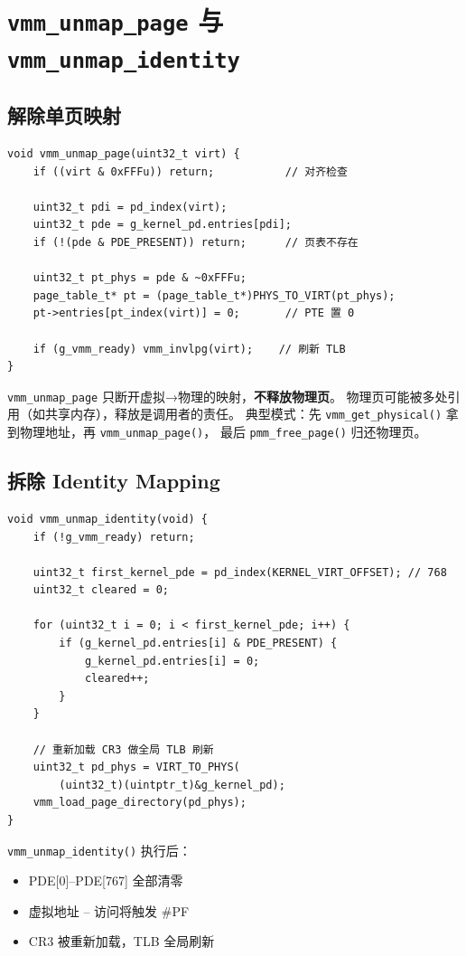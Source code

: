 \section{\texttt{vmm\_unmap\_page} 与 \texttt{vmm\_unmap\_identity}}

\subsection{解除单页映射}

\begin{lstlisting}[style=cstyle]
void vmm_unmap_page(uint32_t virt) {
    if ((virt & 0xFFFu)) return;           // 对齐检查

    uint32_t pdi = pd_index(virt);
    uint32_t pde = g_kernel_pd.entries[pdi];
    if (!(pde & PDE_PRESENT)) return;      // 页表不存在

    uint32_t pt_phys = pde & ~0xFFFu;
    page_table_t* pt = (page_table_t*)PHYS_TO_VIRT(pt_phys);
    pt->entries[pt_index(virt)] = 0;       // PTE 置 0

    if (g_vmm_ready) vmm_invlpg(virt);    // 刷新 TLB
}
\end{lstlisting}

\begin{warnbox}
\texttt{vmm\_unmap\_page} 只断开虚拟→物理的映射，\textbf{不释放物理页}。
物理页可能被多处引用（如共享内存），释放是调用者的责任。
典型模式：先 \texttt{vmm\_get\_physical()} 拿到物理地址，再 \texttt{vmm\_unmap\_page()}，
最后 \texttt{pmm\_free\_page()} 归还物理页。
\end{warnbox}

\subsection{拆除 Identity Mapping}

\begin{lstlisting}[style=cstyle]
void vmm_unmap_identity(void) {
    if (!g_vmm_ready) return;

    uint32_t first_kernel_pde = pd_index(KERNEL_VIRT_OFFSET); // 768
    uint32_t cleared = 0;

    for (uint32_t i = 0; i < first_kernel_pde; i++) {
        if (g_kernel_pd.entries[i] & PDE_PRESENT) {
            g_kernel_pd.entries[i] = 0;
            cleared++;
        }
    }

    // 重新加载 CR3 做全局 TLB 刷新
    uint32_t pd_phys = VIRT_TO_PHYS(
        (uint32_t)(uintptr_t)&g_kernel_pd);
    vmm_load_page_directory(pd_phys);
}
\end{lstlisting}

\begin{cpustate}
\texttt{vmm\_unmap\_identity()} 执行后：
\begin{itemize}
  \item PDE[0]--PDE[767] 全部清零
  \item 虚拟地址 -- 访问将触发 \#PF
  \item CR3 被重新加载，TLB 全局刷新
\end{itemize}
\end{cpustate}


